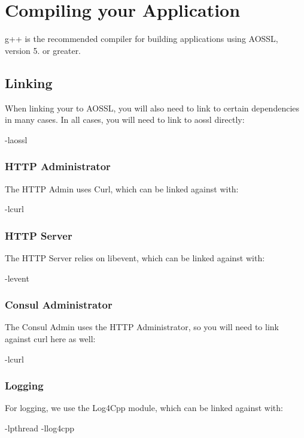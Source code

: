 \section*{Compiling your Application}

g++ is the recommended compiler for building applications using A\+O\+S\+SL, version 5. or greater.

\subsection*{Linking}

When linking your to A\+O\+S\+SL, you will also need to link to certain dependencies in many cases. In all cases, you will need to link to aossl directly\+: \begin{DoxyVerb}-laossl
\end{DoxyVerb}


\subsubsection*{H\+T\+TP Administrator}

The H\+T\+TP Admin uses Curl, which can be linked against with\+: \begin{DoxyVerb}-lcurl
\end{DoxyVerb}


\subsubsection*{H\+T\+TP Server}

The H\+T\+TP Server relies on libevent, which can be linked against with\+: \begin{DoxyVerb}-levent
\end{DoxyVerb}


\subsubsection*{Consul Administrator}

The Consul Admin uses the H\+T\+TP Administrator, so you will need to link against curl here as well\+: \begin{DoxyVerb}-lcurl
\end{DoxyVerb}


\subsubsection*{Logging}

For logging, we use the Log4\+Cpp module, which can be linked against with\+: \begin{DoxyVerb}-lpthread -llog4cpp
\end{DoxyVerb}


